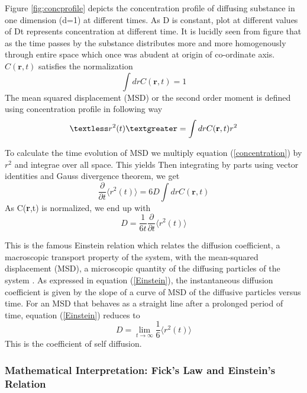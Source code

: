     \noindent Figure \ref{fig:concprofile} depicts the concentration profile of diffusing substance in one dimension (d=1) at different times. As D is constant, plot at different values of Dt represents concentration at different time. It is lucidly seen from figure that as the time passes by the substance distributes more and more homogenously through entire space which once was abudent at origin of co-ordinate axis.\\
    $C(\textbf{r},t)$ satisfies the normalization
    \begin{equation}
    \label{normalization}
    \int drC(\textbf{r},t) = 1
    \end{equation}
    The mean squared displacement (MSD) or the second order moment is defined using concentration profile in following way
    \begin{equation}
    \label{SOM}
    \textless r^2(t) \textgreater = \int drC(\textbf{r},t)r^2
    \end{equation}
    
     To calculate the time evolution of MSD we multiply equation (\ref{concentration}) by $r^2$ and integrae over all space. This yields Then integrating by parts using vector identities and Gauss divergence theorem, we get
    \begin{equation}
    \frac{\partial}{\partial t}\langle r^2(t) \rangle = 6D\int dr C(\textbf{r},t)
    \end{equation}
    As C(\textbf{r},t) is normalized, we end up with
    \begin{equation}
    \label{Einstein}
    D = \frac{1}{6t} \frac{\partial}{\partial t} \langle r^2(t) \rangle
    \end{equation} 
    
    \noindent This is the famous Einstein relation which relates the diffusion coefficient, a macroscopic transport property of the system, with the mean-squared displacement (MSD), a microscopic quantity of the diffusing particles of the system \cite{crank}. As expressed in equation (\ref{Einstein}), the instantaneous diffusion coefficient is given by the slope of a curve of MSD of the diffusive particles versus time. For an MSD that behaves as a straight line after a prolonged period of time, equation (\ref{Einstein}) reduces to
    \begin{equation}
    D = \lim_{t \to \infty} \frac{1}{6} \langle r^2(t) \rangle
    \end{equation}
    \noindent This is the coefficient of self diffusion.
 \subsubsection{Mathematical Interpretation: Fick's Law and Einstein's Relation}
 
